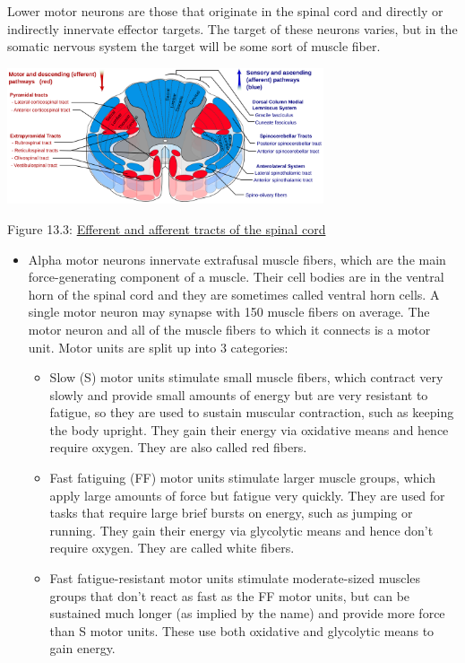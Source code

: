 Lower motor neurons are those that originate in the spinal cord and
directly or indirectly innervate effector targets. The target of these
neurons varies, but in the somatic nervous system the target will be
some sort of muscle fiber.

\protect\hypertarget{fig:spinaltracts}{}{}
\includegraphics[width=0.7\textwidth,height=\textheight]{figures/cns/Spinal_cord_tracts_-_English.svg}

Figure 13.3:
\href{https://commons.wikimedia.org/wiki/File:Spinal_cord_tracts_-_English.svg}{Efferent
and afferent tracts of the spinal cord}

\begin{itemize}
\item
  Alpha motor neurons innervate extrafusal muscle fibers, which are the
  main force-generating component of a muscle. Their cell bodies are in
  the ventral horn of the spinal cord and they are sometimes called
  ventral horn cells. A single motor neuron may synapse with 150 muscle
  fibers on average. The motor neuron and all of the muscle fibers to
  which it connects is a motor unit. Motor units are split up into 3
  categories:

  \begin{itemize}
  \tightlist
  \item
    Slow (S) motor units stimulate small muscle fibers, which contract
    very slowly and provide small amounts of energy but are very
    resistant to fatigue, so they are used to sustain muscular
    contraction, such as keeping the body upright. They gain their
    energy via oxidative means and hence require oxygen. They are also
    called red fibers.
  \item
    Fast fatiguing (FF) motor units stimulate larger muscle groups,
    which apply large amounts of force but fatigue very quickly. They
    are used for tasks that require large brief bursts on energy, such
    as jumping or running. They gain their energy via glycolytic means
    and hence don't require oxygen. They are called white fibers.
  \item
    Fast fatigue-resistant motor units stimulate moderate-sized muscles
    groups that don't react as fast as the FF motor units, but can be
    sustained much longer (as implied by the name) and provide more
    force than S motor units. These use both oxidative and glycolytic
    means to gain energy.
  \end{itemize}
\end{itemize}

